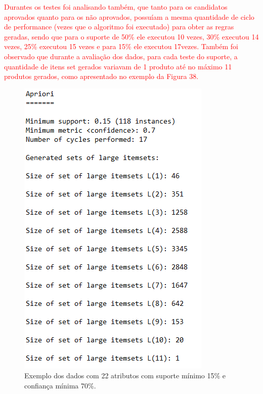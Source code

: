 \par
\textcolor{red}{Durantes os testes foi analisando também, que tanto para os candidatos aprovados quanto para os não aprovados, possuíam a mesma quantidade de ciclo de performance (vezes que o algoritmo foi executado) para obter as regras geradas, sendo que para o suporte de 50\% ele executou 10 vezes, 30\% executou 14 vezes, 25\% executou 15 vezes e para 15\% ele executou 17vezes. Também foi observado que durante a avaliação dos dados, para cada teste do suporte, a quantidade de itens set gerados variavam de 1 produto até no máximo 11 produtos gerados, como apresentado no exemplo da Figura 38.}


\par
\begin{figure}[!htp]
	\begin{center}
    \caption{\label{fig:waveform_fig} Exemplo dos dados com 22 atributos com suporte mínimo 15\% e confiança mínima 70\%.}
	\includegraphics[scale=0.90]{Figuras/Resultados_valores_apriori.png}
	\end{center}
\end{figure}

\par
\textcolor{red}{}